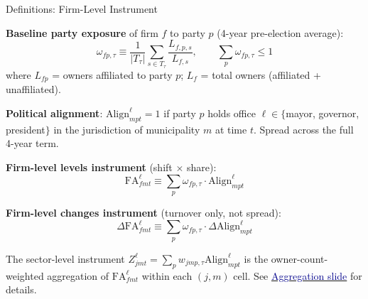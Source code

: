 \documentclass[aspectratio=169,11pt]{beamer}
\newcommand{\Align}{\mathrm{Align}}
\newcommand{\FA}{\mathrm{FA}}
\begin{document}
\begin{frame}{Definitions: Firm-Level Instrument}

\textbf{Baseline party exposure} of firm $f$ to party $p$ (4-year pre-election average):
\begin{equation*}
    \omega_{fp,\tau} \equiv \frac{1}{|T_\tau|}\sum_{s \in T_\tau} \frac{L_{f,p,s}}{L_{f,s}},
    \qquad \sum_p \omega_{fp,\tau} \leq 1
\end{equation*}
where $L_{fp}$ = owners affiliated to party $p$; $L_f$ = total owners (affiliated + unaffiliated).

\smallskip

\textbf{Political alignment}: $\Align^\ell_{mpt} = 1$ if party $p$ holds office $\ell \in \{$mayor, governor, president$\}$ in the jurisdiction of municipality $m$ at time $t$. Spread across the full 4-year term.

\smallskip

\textbf{Firm-level levels instrument} (shift $\times$ share):
\begin{equation*}
    \FA^\ell_{fmt} \equiv \sum_p \omega_{fp,\tau} \cdot \Align^\ell_{mpt}
\end{equation*}

\textbf{Firm-level changes instrument} (turnover only, not spread):
\begin{equation*}
    \Delta\FA^\ell_{fmt} \equiv \sum_p \omega_{fp,\tau} \cdot \Delta\Align^\ell_{mpt}
\end{equation*}

\smallskip

{\footnotesize The sector-level instrument $Z^\ell_{jmt} = \sum_p w_{jmp,\tau} \Align^\ell_{mpt}$ is the owner-count-weighted aggregation of $\FA^\ell_{fmt}$ within each $(j,m)$ cell. See \hyperlink{slide:aggregation}{\textcolor{darkblue}{Aggregation slide}} for details.}

\end{frame}
\end{document}
